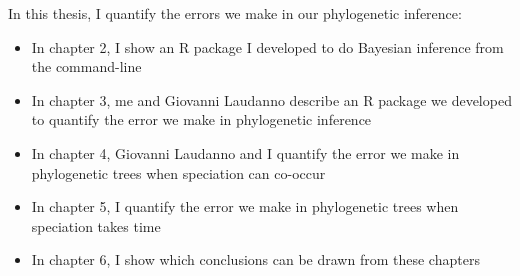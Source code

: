 In this thesis, I quantify the errors we make in our phylogenetic inference:

\begin{itemize}
	\item In chapter 2, I show an R package I developed to do Bayesian
    inference from the command-line
	\item In chapter 3, me and Giovanni Laudanno describe an R package we 
    developed to quantify the error we make in phylogenetic inference
	\item In chapter 4, Giovanni Laudanno and I quantify the error we make 
    in phylogenetic trees when speciation can co-occur
	\item In chapter 5, I quantify the error we make 
    in phylogenetic trees when speciation takes time
	\item In chapter 6, I show which conclusions can be drawn from these chapters
\end{itemize}


